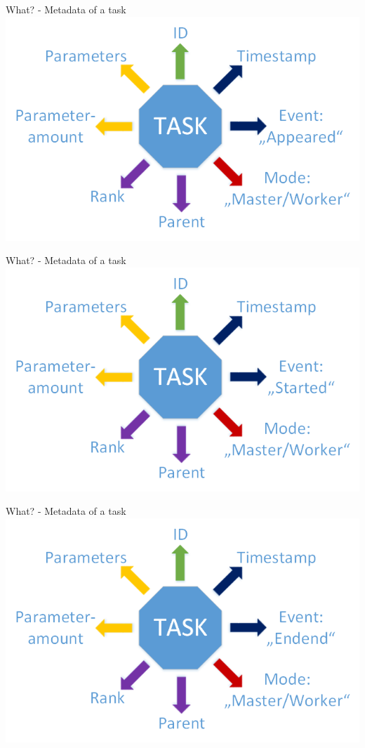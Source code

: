 	\begin{frame}{What? - Metadata of a task}
	\includegraphics[width=1.0\textwidth]{images/Task/Zeichnung1.png}
	\end{frame}
	
	\begin{frame}{What? - Metadata of a task}
	\includegraphics[width=1.0\textwidth]{images/Task/Zeichnung2.png}
	\end{frame}
	
	\begin{frame}{What? - Metadata of a task}
	\includegraphics[width=1.0\textwidth]{images/Task/Zeichnung3.png}
	\end{frame}
	
